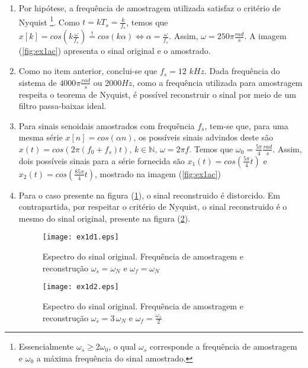     \begin{enumerate}

        \item %
        
        Por hipótese, a frequência de amostragem utilizada satisfaz o critério de Nyquist \footnote{Essencialmente $\omega_s \geq 2\omega_0$, o qual $\omega_s$ corresponde a frequência de amostragem e $\omega_0$ a máxima frequência do sinal amostrado.}. Como $t = kT_s = \frac{k}{f_s}$, temos que $x[k] = cos(k \frac{\omega}{f_s})  \stackrel{!}{=} cos(k \alpha) \Longleftrightarrow \alpha = \frac{\omega}{f_s}$. Assim, $\omega = 250\pi \frac{rad}{s}$. A imagem (\ref{fig:ex1ac}) apresenta o sinal original e o amostrado.
        
        \item %
        
        Como no item anterior, conclui-se que $f_s = 12$ $kHz$. Dada frequência do sistema de $4000\pi \frac{rad}{s}$ ou $2000 Hz$, como a frequência utilizada para amostragem respeita o teorema de Nyquist, é possível reconstruir o sinal por meio de um filtro passa-baixas ideal. 
        
        \item %
        Para sinais senoidais amostrados com frequência $f_s$, tem-se que, para uma mesma série $x[n] = cos(\alpha n)$, os possíveis sinais advindos deste são $x(t) = cos(2 \pi (f_0 + f_s)t) \mbox{, } k \in \mathbb{N} \mbox{, } \omega = 2 \pi f$. Temos que $\omega_0 = \frac{5\pi}{4} \frac{rad}{s}$. Assim, dois possíveis sinais para a série fornecida são $x_1(t) = cos(\frac{5\pi}{4} t )$ e $x_2(t) = cos(\frac{85\pi}{4} t)$, mostrado na imagem (\ref{fig:ex1ac}) 
        
        \item %
        
        Para o caso presente na figura (\ref{fig:ex1d1}), o sinal reconstruido é distorcido. Em contrapartida, por respeitar o critério de Nyquist, o sinal reconstruido é o mesmo do sinal original, presente na figura (\ref{fig:ex1d2}).
        
        \newpage

        \begin{figure}[H]
            \centering
            \texttt{[image: ex1d1.eps]}
            \caption{Espectro do sinal original. Frequência de amostragem e reconstrução $\omega_s = \omega_N$ e $\omega_f = \omega_N$}
            \label{fig:ex1d1}
        \end{figure}%
    
        \begin{figure}[H]
            \centering
            \texttt{[image: ex1d2.eps]}
            \caption{Espectro do sinal original. Frequência de amostragem e reconstrução $\omega_s = 3 \, \omega_N$ e $\omega_f = \frac{\omega_s}{2}$}
            \label{fig:ex1d2}
        \end{figure}
    
    \end{enumerate}